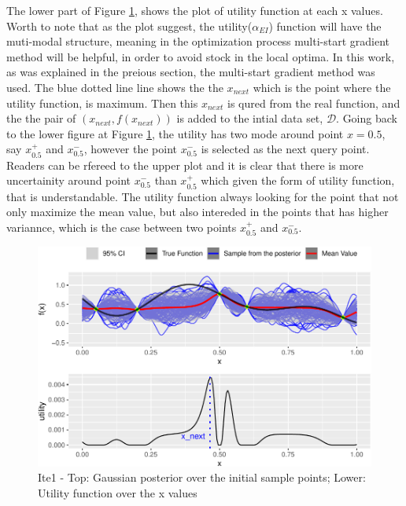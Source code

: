 \documentclass[]{elsarticle} %
\begin{document}
The lower part of Figure \ref{fig:exampleshow}, shows the plot of utility function at each x values. Worth to note that as the plot suggest, the utility(\(\alpha_{EI}\)) function will have the muti-modal structure, meaning in the optimization process multi-start gradient method will be helpful, in order to avoid stock in the local optima. In this work, as was explained in the preious section, the multi-start gradient method was used. The blue dotted line line shows the the \(x_{next}\) which is the point where the utility function, is maximum. Then this \(x_{next}\) is qured from the real function, and the the pair of \((x_{next}, f(x_{next}))\) is added to the intial data set, \(\mathcal{D}\). Going back to the lower figure at Figure \ref{fig:exampleshow}, the utility has two mode around point \(x=0.5\), say \(x_{0.5}^+\) and \(x_{0.5}^-\), however the point \(x_{0.5}^-\) is selected as the next query point. Readers can be rfereed to the upper plot and it is clear that there is more uncertainity around point \(x_{0.5}^-\) than \(x_{0.5}^+\) which given the form of utility function, that is understandable. The utility function always looking for the point that not only maximize the mean value, but also intereded in the points that has higher variannce, which is the case between two points \(x_{0.5}^+\) and \(x_{0.5}^-\).

\begin{figure}

\includegraphics[width=1\linewidth,height=0.75\textheight]{0_Paper1_main_files/figure-latex/exampleshow-1} \hfill{}

\caption{Ite1 - Top: Gaussian posterior over the initial sample points; Lower: Utility function over the x values}\label{fig:exampleshow}
\end{figure}
\end{document}

